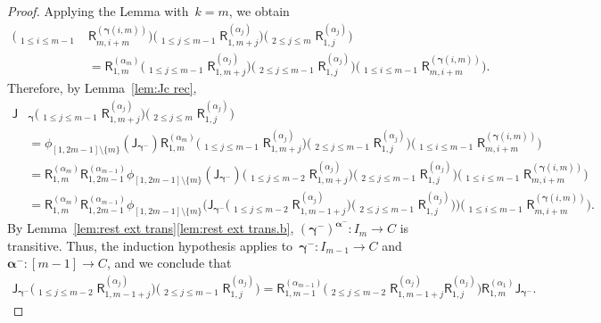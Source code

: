 \documentclass[12pt, reqno]{amsart}
\newcommand{\sfR}{\mathsf{R}}
\theoremstyle{definition}
\newcommand{\dscprod}{\mathop{\overleftarrow{\prod}}}
\numberwithin{equation}{section}
\begin{document}
\begin{proof}
Applying the Lemma with~$k=m$, we obtain
\begin{align*}
    \Big(\dscprod_{1\le i\le m-1}&
\sfR_{m,i+m}^{(\boldsymbol\gamma(i,m))}\Big)\Big(\dscprod_{1\le j\le m-1}
\sfR_{1,m+j}^{(\alpha_j)}\Big)\Big(\dscprod_{2\le j\le m}
\sfR_{1,j}^{(\alpha_j)}\Big)\\
&=\sfR_{1,m}^{(\alpha_m)}
\Big(\dscprod_{1\le j\le m-1}
\sfR_{1,m+j}^{(\alpha_j)}\Big)
\Big(\dscprod_{2\le j\le m-1}
\sfR_{1,j}^{(\alpha_j)}\Big)\Big(\dscprod_{1\le i\le m-1}
\sfR_{m,i+m}^{(\boldsymbol\gamma(i,m))}\Big).
\end{align*}
Therefore, by Lemma~\ref{lem:Jc rec},
\begin{align*}
    \mathsf J&_{\boldsymbol\gamma}\Big(\dscprod_{1\le j\le m-1}
\sfR_{1,m+j}^{(\alpha_j)}\Big)\Big(\dscprod_{2\le j\le m}
\sfR_{1,j}^{(\alpha_j)}\Big)
\\
&=\phi_{[1,2m-1]\setminus\{m\}}(\mathsf J_{\boldsymbol\gamma^-})
\sfR_{1,m}^{(\alpha_m)}
\Big(\dscprod_{1\le j\le m-1}
\sfR_{1,m+j}^{(\alpha_j)}\Big)\Big(\dscprod_{2\le j\le m-1}
\sfR_{1,j}^{(\alpha_j)}\Big)\Big(\dscprod_{1\le i\le m-1}
\sfR_{m,i+m}^{(\boldsymbol\gamma(i,m))}\Big)\\
&=\sfR_{1,m}^{(\alpha_m)}\sfR_{1,2m-1}^{(\alpha_{m-1})}\phi_{[1,2m-1]\setminus\{m\}}(
\mathsf J_{\boldsymbol\gamma^-})
\Big(\dscprod_{1\le j\le m-2}
\sfR_{1,m+j}^{(\alpha_j)}\Big) 
\Big(\dscprod_{2\le j\le m-1}
\sfR_{1,j}^{(\alpha_j)}\Big)\Big(\dscprod_{1\le i\le m-1}
\sfR_{m,i+m}^{(\boldsymbol\gamma(i,m))}\Big)\\
&=\sfR_{1,m}^{(\alpha_m)}\sfR_{1,2m-1}^{(\alpha_{m-1})}\phi_{[1,2m-1]\setminus\{m\}}\Big(
\mathsf J_{\boldsymbol\gamma^-}
\Big(\dscprod_{1\le j\le m-2}\!\!
\sfR_{1,m-1+j}^{(\alpha_j)}\Big) 
\Big(\dscprod_{2\le j\le m-1}\!\!
\sfR_{1,j}^{(\alpha_j)}\Big)\Big)\Big(\dscprod_{1\le i\le m-1}\!\!
\sfR_{m,i+m}^{(\boldsymbol\gamma(i,m))}\Big).
\end{align*}
By Lemma~\ref{lem:rest ext trans}\ref{lem:rest ext trans.b},
$(\boldsymbol\gamma^-)^{\boldsymbol{\alpha}^-}:I_m\to C$ 
is transitive.
Thus, the induction hypothesis applies to~$\boldsymbol\gamma^-:I_{m-1}\to C$ and~$\boldsymbol\alpha^-:[m-1]\to C$, and  we conclude that 
\begin{align*}
\mathsf J_{\boldsymbol\gamma^-}\Big(\dscprod_{1\le j\le m-2}
\sfR_{1,m-1+j}^{(\alpha_j)}\Big) 
\Big(\dscprod_{2\le j\le m-1}
\sfR_{1,j}^{(\alpha_j)}\Big)=\sfR_{1,m-1}^{(\alpha_{m-1})}\Big(\dscprod_{2\le j\le m-2}
\sfR_{1,m-1+j}^{(\alpha_j)}\sfR_{1,j}^{(\alpha_j)}\Big)\sfR_{1,m}^{(\alpha_1)}
\mathsf J_{\boldsymbol\gamma^-}.

\end{align*}
\end{proof}
\end{document}
